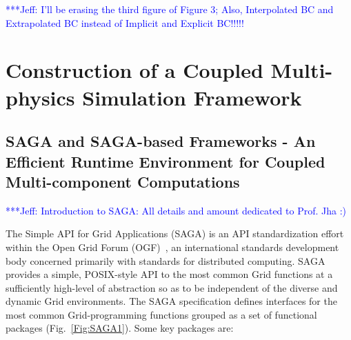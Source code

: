 \documentclass[preprint,12pt]{elsarticle}
\newcommand{\skonote}[1]{ {\textcolor{blue} { ***Jeff: #1 }}}
\newcommand{\skonote}[1]{}
\begin{document}
\skonote{I'll be erasing the third figure of Figure 3; Also, Interpolated BC and Extrapolated BC instead of Implicit and Explicit BC!!!!!}




%



\section{Construction of a Coupled Multi-physics Simulation Framework}
\subsection{SAGA and SAGA-based Frameworks - An Efficient Runtime Environment for Coupled Multi-component Computations}

\skonote{Introduction to SAGA: All details and amount dedicated to Prof. Jha :) }

The Simple API for Grid Applications (SAGA) is an API standardization effort within the Open Grid Forum (OGF)~\cite{ogf_web}, an international standards development body concerned primarily with standards for distributed computing. SAGA provides a simple, POSIX-style API to the most common Grid functions at a sufficiently high-level of abstraction so as to be independent of the diverse and dynamic Grid environments. The SAGA specification defines interfaces for the most common Grid-programming functions grouped as a set of functional packages (Fig.~\ref{Fig:SAGA1}). Some key packages are:
\end{document}
